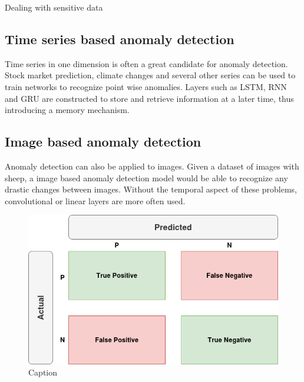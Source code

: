 Dealing with sensitive data 

\subsection{Time series based anomaly detection}

Time series in one dimension is often a great candidate for anomaly detection. Stock market prediction, climate changes and several other series can be used to train networks to recognize point wise anomalies. Layers such as LSTM, RNN and GRU are constructed to store and retrieve information at a later time, thus introducing a memory mechanism. 

\subsection{Image based anomaly detection}

Anomaly detection can also be applied to images. Given a dataset of images with sheep, a image based anomaly detection model would be able to recognize any drastic changes between images. Without the temporal aspect of these problems, convolutional or linear layers are more often used. 

\begin{figure}[!h]
    \centering
    \includegraphics[width=0.5\linewidth]{figures/confmat.png}
    \caption{Caption}
    \label{fig:confmat}
\end{figure}
